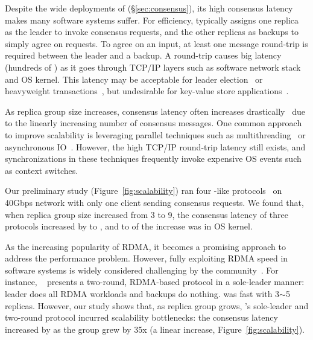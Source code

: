 Despite the wide deployments of \paxos (\S\ref{sec:consensus}), its high 
consensus latency makes many software systems suffer. For efficiency, \paxos 
typically assigns one replica as the leader to invoke consensus requests, and 
the other replicas as backups to simply agree on requests. To agree on an 
input, at least one message round-trip is required between the leader and a 
backup. A round-trip causes big latency (hundreds of \us) as it goes through 
TCP/IP layers such as software network stack and OS kernel. This latency may 
be acceptable for leader election~\cite{chubby:osdi,zookeeper} or heavyweight 
transactions~\cite{crane:sosp15,eve:osdi12}, but undesirable for
key-value store applications~\cite{redis,memcached}.

As replica group size increases, \paxos consensus latency often increases
drastically~\cite{scatter:sosp11} due to the linearly increasing number of 
consensus messages. One common approach to improve \paxos scalability is 
leveraging parallel techniques such as multithreading~\cite{zookeeper, 
spaxos:srds12} or asynchronous IO~\cite{crane:sosp15, libpaxos}. However, the 
high TCP/IP round-trip latency still exists, and synchronizations in these 
techniques frequently invoke expensive OS events such as context switches.

Our preliminary study (Figure~\ref{fig:scalability}) ran four \paxos-like 
protocols~\cite{zookeeper, spaxos:srds12, crane:sosp15, libpaxos} on 40Gbps 
network with only one client sending consensus requests. We found that, when 
replica group size increased from 3 to 9, the consensus latency of three 
protocols increased by \tradlatencyincreaselow to 
\tradlatencyincreasehigh, and \systemcostlow to \systemcosthigh of the increase 
was in OS kernel.

As the increasing popularity of RDMA, it becomes a promising 
approach to address the \paxos performance problem. However, fully exploiting 
RDMA speed in software systems is widely considered challenging by 
the community~\cite{pilaf:usenix14,herd:sigcomm14,
farm:sosp15,dare:hpdc15}. For instance, \dare~\cite{dare:hpdc15} presents a
two-round, RDMA-based \paxos protocol in a sole-leader manner: leader does all 
RDMA workloads and backups do nothing. \dare was fast with 3$\sim$5 
replicas. However, our study shows that, as replica group grows, \dare's 
sole-leader and two-round protocol incurred scalability bottlenecks: the 
consensus latency increased by \darescalability as the group grew by 35x (a 
linear increase, Figure~\ref{fig:scalability}).

